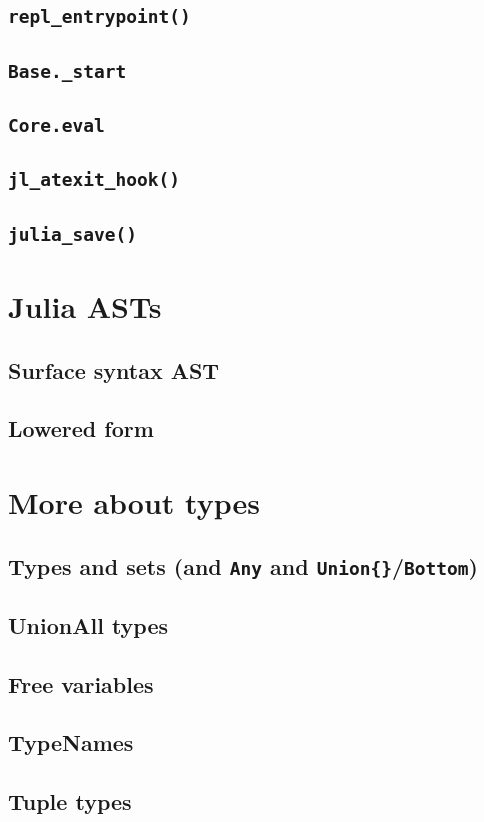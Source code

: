     \subsection{\texttt{repl\_entrypoint()}}
    \subsection{\texttt{Base.\_start}}
    \subsection{\texttt{Core.eval}}
    \subsection{\texttt{jl\_atexit\_hook()}}
    \subsection{\texttt{julia\_save()}}
    \section{Julia ASTs}
    \subsection{Surface syntax AST}
    \subsection{Lowered form}
    \section{More about types}
    \subsection{Types and sets (and \texttt{Any} and \texttt{Union\{\}}/\texttt{Bottom})}
    \subsection{UnionAll types}
    \subsection{Free variables}
    \subsection{TypeNames}
    \subsection{Tuple types}
